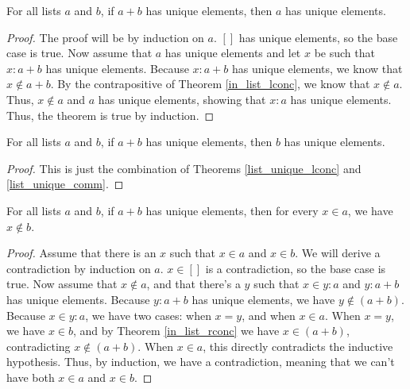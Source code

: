 \documentclass[../math.tex]{subfiles}
\begin{document}
\begin{theorem} \label{list_unique_lconc}
    For all lists $a$ and $b$, if $a + b$ has unique elements, then $a$ has
    unique elements.
\end{theorem}
\begin{proof}
    The proof will be by induction on $a$.  $[]$ has unique elements, so the
    base case is true.  Now assume that $a$ has unique elements and let $x$ be
    such that $x : a + b$ has unique elements.  Because $x : a + b$ has unique
    elements, we know that $x \notin a + b$.  By the contrapositive of Theorem
    \ref{in_list_lconc}, we know that $x \notin a$.  Thus, $x \notin a$ and $a$
    has unique elements, showing that $x : a$ has unique elements.  Thus, the
    theorem is true by induction.
\end{proof}

\begin{theorem} \label{list_unique_rconc}
    For all lists $a$ and $b$, if $a + b$ has unique elements, then $b$ has
    unique elements.
\end{theorem}
\begin{proof}
    This is just the combination of Theorems \ref{list_unique_lconc} and
    \ref{list_unique_comm}.
\end{proof}

\begin{theorem} \label{list_unique_conc}
    For all lists $a$ and $b$, if $a + b$ has unique elements, then for every $x
    \in a$, we have $x \notin b$.
\end{theorem}
\begin{proof}
    Assume that there is an $x$ such that $x \in a$ and $x \in b$.  We will
    derive a contradiction by induction on $a$.  $x \in []$ is a contradiction,
    so the base case is true.  Now assume that $x \notin a$, and that there's a
    $y$ such that $x \in y : a$ and $y : a + b$ has unique elements.  Because $y
    : a + b$ has unique elements, we have $y \notin (a + b)$.  Because $x \in y
    : a$, we have two cases: when $x = y$, and when $x \in a$.  When $x = y$, we
    have $x \in b$, and by Theorem \ref{in_list_rconc} we have $x \in (a + b)$,
    contradicting $x \notin (a + b)$.  When $x \in a$, this directly
    contradicts the inductive hypothesis.  Thus, by induction, we have a
    contradiction, meaning that we can't have both $x \in a$ and $x \in b$.
\end{proof}
\end{document}

